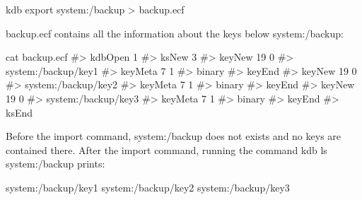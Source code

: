 \begin{DoxyCode}
kdb export system:/backup > backup.ecf
\end{DoxyCode}


{\ttfamily backup.\+ecf} contains all the information about the keys below {\ttfamily system\+:/backup}\+:


\begin{DoxyCode}
cat backup.ecf
#> kdbOpen 1
#> ksNew 3
#> keyNew 19 0
#> system:/backup/key1
#> keyMeta 7 1
#> binary
#> keyEnd
#> keyNew 19 0
#> system:/backup/key2
#> keyMeta 7 1
#> binary
#> keyEnd
#> keyNew 19 0
#> system:/backup/key3
#> keyMeta 7 1
#> binary
#> keyEnd
#> ksEnd
\end{DoxyCode}


Before the import command, {\ttfamily system\+:/backup} does not exists and no keys are contained there. After the import command, running the command {\ttfamily kdb ls system\+:/backup} prints\+:


\begin{DoxyCode}
system:/backup/key1
system:/backup/key2
system:/backup/key3
\end{DoxyCode}
 
